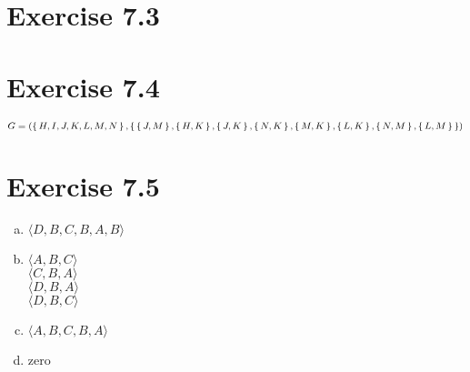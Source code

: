 \documentclass{article} %
\newcommand{\homeworkNumber}{7}
\begin{document}
\section*{Exercise \homeworkNumber.3}



\section*{Exercise \homeworkNumber.4}

$G = (\set{H,I,J,K,L,M,N},\set{\set{J,M}, \set{H,K}, \set{J,K}, \set{N,K}, \set{M,K}, \set{L,K}, \set{N,M}, \set{L,M}})$

\section*{Exercise \homeworkNumber.5}

\begin{enumerate}[a)]
\item $\langle D, B, C, B, A, B \rangle$

\item $\langle A, B, C \rangle$ \\ 
$\langle C, B, A \rangle$ \\
$\langle D, B, A \rangle$ \\
$\langle D, B, C \rangle$

\item $\langle A, B, C, B, A \rangle$

\item zero


\end{enumerate}
\end{document}
